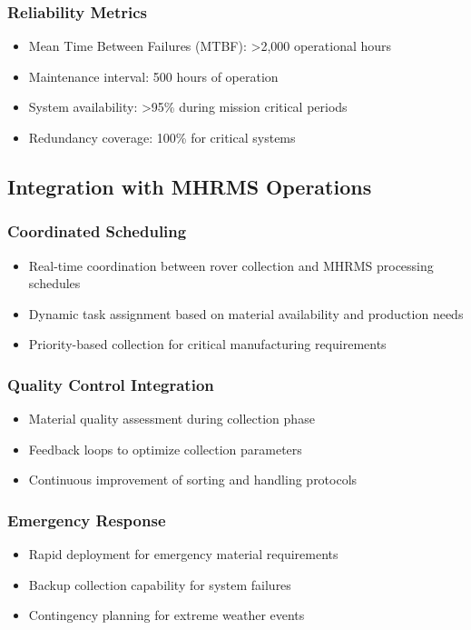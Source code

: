 \documentclass[12pt, a4paper]{article}
\begin{document}
\subsubsection{Reliability Metrics}
\begin{itemize}
    \item Mean Time Between Failures (MTBF): >2,000 operational hours
    \item Maintenance interval: 500 hours of operation
    \item System availability: >95\% during mission critical periods
    \item Redundancy coverage: 100\% for critical systems
\end{itemize}

\subsection{Integration with MHRMS Operations}

\subsubsection{Coordinated Scheduling}
\begin{itemize}
    \item Real-time coordination between rover collection and MHRMS processing schedules
    \item Dynamic task assignment based on material availability and production needs
    \item Priority-based collection for critical manufacturing requirements
\end{itemize}

\subsubsection{Quality Control Integration}
\begin{itemize}
    \item Material quality assessment during collection phase
    \item Feedback loops to optimize collection parameters
    \item Continuous improvement of sorting and handling protocols
\end{itemize}

\subsubsection{Emergency Response}
\begin{itemize}
    \item Rapid deployment for emergency material requirements
    \item Backup collection capability for system failures
    \item Contingency planning for extreme weather events
\end{itemize}
\end{document}
